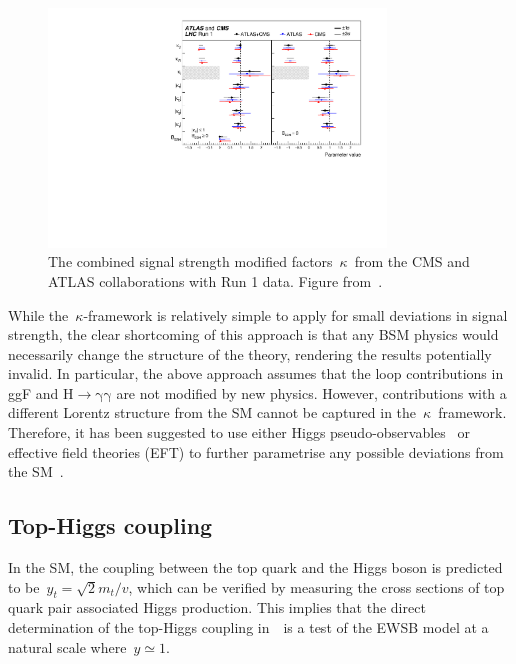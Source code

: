 \begin{figure}
\begin{centering}
\includegraphics[width=0.8\textwidth]{figures/theory/CMS-HIG-15-002_Figure_015.pdf}
\caption[The Higgs signal strength modifiers as measured by CMS and ATLAS]{The combined signal strength modified factors~$\kappa$~from the CMS and ATLAS collaborations with Run 1 data. Figure from~\cite{Khachatryan:2016vau}.}
\label{fig:higgs_kappa}
\end{centering}
\end{figure}

While the~$\kappa$-framework is relatively simple to apply for small deviations in signal strength, the clear shortcoming of this approach is that any BSM physics would necessarily change the structure of the theory, rendering the results potentially invalid. In particular, the above approach assumes that the loop contributions in ggF and $\mathrm{H} \rightarrow \mathrm{\gamma} \mathrm{\gamma}$ are not modified by new physics. However, contributions with a different Lorentz structure from the SM cannot be captured in the~$\kappa$~framework. Therefore, it has been suggested to use either Higgs pseudo-observables~\cite{Gonzalez-Alonso:2014eva} or effective field theories (EFT) to further parametrise any possible deviations from the SM~\cite{Buchmuller:1985jz,Grzadkowski:2010es}.

\subsection{Top-Higgs coupling}
\label{sec:top_higgs}
In the SM, the coupling between the top quark and the Higgs boson is predicted to be~$y_t = \sqrt{2} m_t / v$, which can be verified by measuring the cross sections of top quark pair associated Higgs production. This implies that the direct determination of the top-Higgs coupling in~\ttH~is a test of the EWSB model at a natural scale where~$y \simeq 1$. 

